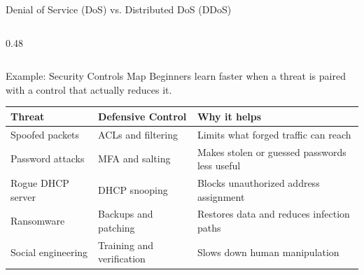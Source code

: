 \documentclass[aspectratio=169]{beamer}  %
\begin{document}
\begin{frame}{Denial of Service (DoS) vs. Distributed DoS (DDoS)}
\begin{columns}[T]
\begin{column}{0.48\textwidth}
            
        \end{column}
    \end{columns}
\end{frame}

\begin{frame}{Example: Security Controls Map}
    \footnotesize
    Beginners learn faster when a threat is paired with a control that actually reduces it.

    \vspace{0.4em}
    \begin{table}[]
        \renewcommand{\arraystretch}{1.2}
        \centering
        \begin{tabular}{|l|l|l|}
        \hline
        \rowcolor[HTML]{EFEFEF} \textbf{Threat} & \textbf{Defensive Control} & \textbf{Why it helps} \\ \hline
        Spoofed packets & ACLs and filtering & Limits what forged traffic can reach \\ \hline
        Password attacks & MFA and salting & Makes stolen or guessed passwords less useful \\ \hline
        Rogue DHCP server & DHCP snooping & Blocks unauthorized address assignment \\ \hline
        Ransomware & Backups and patching & Restores data and reduces infection paths \\ \hline
        Social engineering & Training and verification & Slows down human manipulation \\ \hline
        \end{tabular}
    \end{table}
\end{frame}
\end{document}
